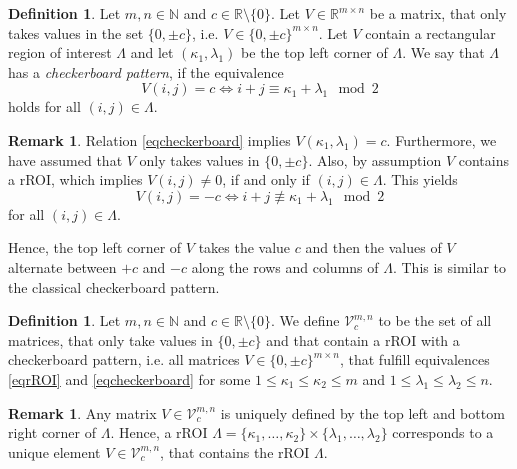 \documentclass[a4paper,12pt]{article}
\theoremstyle{plain}
\theoremstyle{definition}
\newtheorem{definition}[theorem]{Definition}
\newtheorem{remark}[theorem]{Remark}
\begin{document}
\begin{definition}
	Let $m, n \in \mathbb{N}$ and $c \in \mathbb{R} \setminus \{ 0 \}$. Let $V \in \mathbb{R}^{m \times n}$ be a matrix, that only takes values in the set $\{ 0, \pm c \}$, i.e. $V \in \{ 0, \pm c \}^{m \times n}$. Let $V$ contain a rectangular region of interest $\varLambda$ and let $(\kappa_1, \lambda_1)$ be the top left corner of $\varLambda$. We say that $\varLambda$ has a \emph{checkerboard pattern}, if the equivalence
	\begin{equation}\label{eqcheckerboard}
		V(i, j) = c \Leftrightarrow i + j \equiv \kappa_1 + \lambda_1 \mod 2
	\end{equation}
	holds for all $(i, j) \in \varLambda$.
\end{definition}

\begin{remark}
	Relation \eqref{eqcheckerboard} implies $V(\kappa_1, \lambda_1) = c$. Furthermore, we have assumed that $V$ only takes values in $\{ 0, \pm c \}$. Also, by assumption $V$ contains a rROI, which implies $V(i,j) \neq 0$, if and only if $(i, j) \in \varLambda$. This yields
	\begin{equation*}
		V(i, j) = - c \Leftrightarrow i + j \not\equiv \kappa_1 + \lambda_1 \mod 2
	\end{equation*}
	for all $(i, j) \in \varLambda$.
\end{remark}

Hence, the top left corner of $V$ takes the value $c$ and then the values of $V$ alternate between $+c$ and $-c$ along the rows and columns of $\varLambda$. This is similar to the classical checkerboard pattern.

\begin{definition}
	Let $m, n \in \mathbb{N}$ and $c \in \mathbb{R} \setminus \{ 0 \}$. We define $\mathcal{V}_c^{m, n}$ to be the set of all matrices, that only take values in $\{ 0, \pm c \}$ and that contain a rROI with a checkerboard pattern, i.e. all matrices  $V \in \{ 0, \pm c \}^{m \times n}$, that fulfill equivalences \eqref{eqrROI} and \eqref{eqcheckerboard} for some $1 \leq \kappa_1 \leq \kappa_2 \leq m$ and $1 \leq \lambda_1 \leq \lambda_2 \leq n$.
\end{definition}

\begin{remark}
	Any matrix $V \in \mathcal{V}_c^{m, n}$ is uniquely defined by the top left and bottom right corner of $\varLambda$. Hence, a rROI $\varLambda = \{ \kappa_1, \dots, \kappa_2 \} \times \{ \lambda_1, \dots, \lambda_2 \}$ corresponds to a unique element $V \in \mathcal{V}_c^{m, n}$, that contains the rROI $\varLambda$.
\end{remark}
\end{document}
